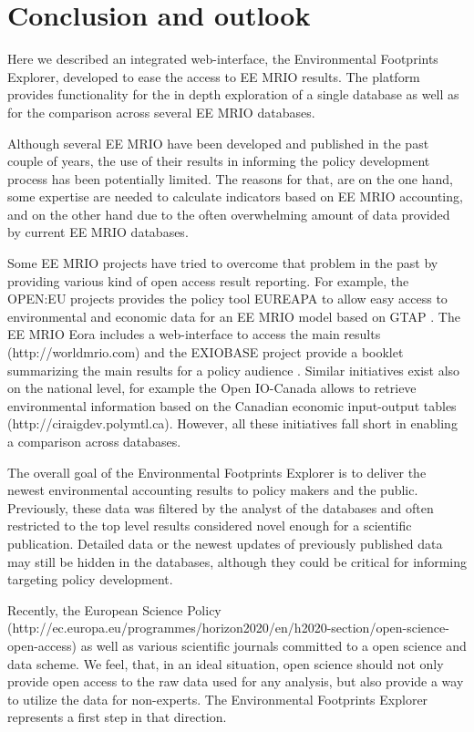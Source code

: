 \section{Conclusion and outlook}

Here we described an integrated web-interface, the Environmental Footprints Explorer, developed to ease the access to EE MRIO results. The platform provides functionality for the in depth exploration of a single database as well as for the comparison across several EE MRIO databases.

Although several EE MRIO have been developed and published in the past couple of years, the use of their results in informing the policy development process has been potentially limited. The reasons for that, are on the one hand, some expertise are needed to calculate indicators based on EE MRIO accounting, and on the other hand due to the often overwhelming amount of data provided by current EE MRIO databases.

Some EE MRIO projects have tried to overcome that problem in the past by providing various kind of open access result reporting. For example, the OPEN:EU projects provides the policy tool EUREAPA to allow easy access to environmental and economic data for an EE MRIO model based on GTAP \cite{Roelich_2014}. The EE MRIO Eora \cite{Lenzen_2013} includes a web-interface to access the main results (http://worldmrio.com) and the EXIOBASE project provide a booklet summarizing the main results for a policy audience \cite{tukker_global_2014}. Similar initiatives exist also on the national level, for example the Open IO-Canada allows to retrieve environmental information based on the Canadian economic input-output tables (http://ciraigdev.polymtl.ca). However, all these initiatives fall short in enabling a comparison across databases.  

The overall goal of the Environmental Footprints Explorer is to deliver the newest environmental accounting results to policy makers and the public. Previously, these data was filtered by the analyst of the databases and often restricted to the top level results considered novel enough for a scientific publication. Detailed data or the newest updates of previously published data may still be hidden in the databases, although they could be critical for informing targeting policy development.

Recently, the European Science Policy (http://ec.europa.eu/programmes/horizon2020/en/h2020-section/open-science-open-access) as well as various scientific journals \cite{Hanson_2011, Stodden_2012, Boulton_2012} committed to a open science and data scheme. We feel, that, in an ideal situation, open science should not only provide open access to the raw data used for any analysis, but also provide a way to utilize the data for non-experts. The Environmental Footprints Explorer represents a first step in that direction.
    
    
    